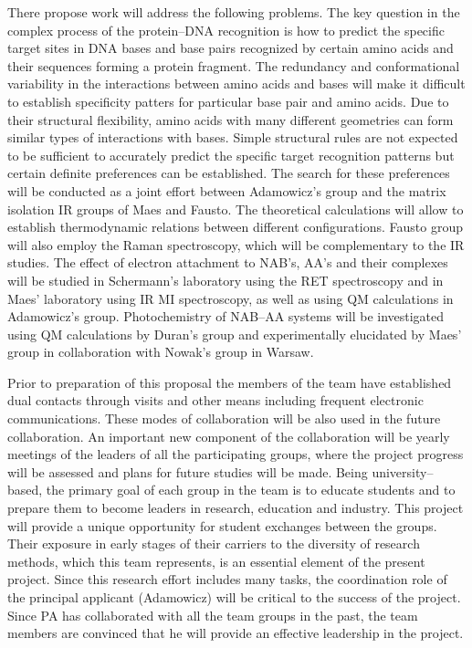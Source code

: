 There propose work will address the following problems.
The key question in the complex
process of the protein--DNA recognition
is how to predict the specific target sites in DNA bases and base
pairs
recognized by certain amino acids and their sequences forming a
protein fragment.
The redundancy and conformational variability in the
interactions between amino acids and bases will make it
difficult to establish specificity patters for
particular base pair and amino acids.
Due to their
structural flexibility, amino acids with many different geometries
can form similar types of interactions with bases.
Simple structural rules are not expected to 
be sufficient to accurately
predict the specific target recognition patterns
but certain definite preferences can be established.
The search for these preferences will be conducted as a joint
effort between Adamowicz's group and the matrix isolation
IR groups of Maes and Fausto. The theoretical calculations
will allow to establish thermodynamic relations between
different configurations. Fausto group will also employ the Raman
spectroscopy,
which will be complementary to the IR studies.
The effect of electron attachment to NAB's, AA's and their
complexes will be studied in Schermann's laboratory using the
RET spectroscopy and in Maes' laboratory using IR MI 
spectroscopy, as well as using QM calculations in 
Adamowicz's group. Photochemistry of NAB--AA systems will
be investigated using QM calculations by Duran's group
and experimentally elucidated by Maes' group in collaboration
with Nowak's group in Warsaw.

Prior to preparation of this proposal the members
of the team have established dual contacts through
visits and other means including frequent electronic
communications. These modes of collaboration will be also 
used in the future collaboration. An important new component
of the collaboration will be yearly meetings of the leaders of
all the participating groups, where the project progress
will be assessed and plans for future studies will be made.
Being university--based, the primary goal of each group in the team
is to educate students
and to prepare them to become leaders in research, education
and industry. This project will provide a unique opportunity
for student exchanges between the groups. Their exposure 
in early stages of their carriers to
the diversity of research methods, which this team represents,
is an essential element of the present project.
Since this research effort includes many tasks, the 
coordination role of the principal applicant (Adamowicz)
will be critical to the success of the project. Since PA has
collaborated with all the team groups in the past,
the team members are convinced that he will provide an
effective leadership in the project.








